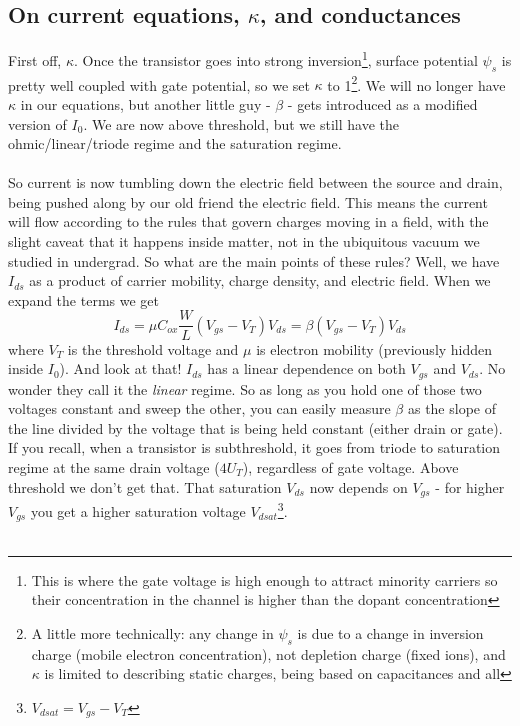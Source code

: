 \documentclass[main]{subfiles}
\begin{document}
\subsection{On current equations, $\kappa$, and conductances}
First off, $\kappa$. Once the transistor goes into strong inversion\footnote{This is where the gate voltage is high enough to attract minority carriers so their concentration in the channel is higher than the dopant concentration}, surface potential $\psi_s$ is pretty well coupled with gate potential, so we set $\kappa$ to 1\footnote{A little more technically: any change in $\psi_s$ is due to a change in inversion charge (mobile electron concentration), not depletion charge (fixed ions), and $\kappa$ is limited to describing static charges, being based on capacitances and all}. We will no longer have $\kappa$ in our equations, but another little guy - $\beta$ - gets introduced as a modified version of $I_0$. We are now above threshold, but we still have the ohmic/linear/triode regime and the saturation regime.\\ \\
So current is now tumbling down the electric field between the source and drain, being pushed along by our old friend the electric field. This means the current will flow according to the rules that govern charges moving in a field, with the slight caveat that it happens inside matter, not in the ubiquitous vacuum we studied in undergrad. So what are the main points of these rules? Well, we have $I_{ds}$ as a product of carrier mobility, charge density, and electric field. When we expand the terms we get
\begin{equation}
I_{ds} = \mu C_{ox}\frac{W}{L}(V_{gs} - V_T)V_{ds} = \beta(V_{gs} - V_T)V_{ds}
\label{abvTriodeEqn}
\end{equation}
where $V_T$ is the threshold voltage and $\mu$ is electron mobility (previously hidden inside $I_0$). And look at that! $I_{ds}$ has a linear dependence on both $V_{gs}$ and $V_{ds}$. No wonder they call it the \emph{linear} regime. So as long as you hold one of those two voltages constant and sweep the other, you can easily measure $\beta$ as the slope of the line divided by the voltage that is being held constant (either drain or gate). If you recall, when a transistor is subthreshold, it goes from triode to saturation regime at the same drain voltage ($4U_T$), regardless of gate voltage. Above threshold we don't get that. That saturation $V_{ds}$ now depends on $V_{gs}$ - for higher $V_{gs}$ you get a higher saturation voltage $V_{dsat}$\footnote{$V_{dsat} = V_{gs} - V_T$}.\\ \\
\end{document}
